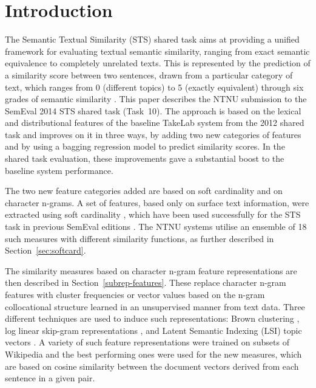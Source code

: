 \section{Introduction}
\label{intro}


The Semantic Textual Similarity (STS) shared task aims at providing a unified framework for evaluating textual semantic similarity, ranging from exact semantic equivalence to completely unrelated texts. This is represented by the prediction of a similarity score between two sentences, drawn from a particular category of text, which ranges from 0 (different topics) to 5 (exactly equivalent) through six grades of semantic similarity \cite{agirre-EtAl:2013:*SEM1}.
This paper describes the NTNU submission to the SemEval 2014 STS shared task (Task~10). 
The approach is based on the lexical and distributional features of the baseline TakeLab system 
from the 2012 shared task \cite{saric2012takelab} and improves on it in three ways,
by adding two new categories of features and by using a bagging regression model to predict similarity scores. 
In the shared task evaluation, these improvements gave a substantial boost to the baseline system performance.

The two new feature categories added are based on soft cardinality and on character n-grams. 
A set of features, based only on surface text information,
were extracted using soft cardinality \cite{chavez_text_2010}, which
have been used successfully for the STS task in previous SemEval editions
\cite{jimenez_soft_2012,jimenez_softcardinality_core:_2013}. 
The NTNU systems utilise an ensemble of 18 such measures with different similarity functions,
as further described in Section~\ref{sec:softcard}.

The similarity measures based on character n-gram feature representations are then
described in Section~\ref{subrep-features}.
These replace character n-gram features with cluster frequencies or vector values 
based on the n-gram collocational structure learned in an unsupervised manner from text data. 
Three different techniques are used to induce such representations: 
Brown clustering \cite{brown1992class}, log linear skip-gram representations \cite{mikolov2013efficient}, 
and Latent Semantic Indexing (LSI) topic vectors \cite{deerwester1990indexing}. 
A variety of such feature representations were trained on subsets of Wikipedia and the best performing ones 
were used for the new  measures, which are based on cosine similarity between the document vectors 
derived from each sentence in a given pair.

